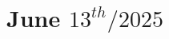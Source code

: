 \documentclass[../main.tex]{subfiles}
\begin{document}
\chapter{June $13^{th} / 2025$}
\label{ch:tufte-design}
\end{document}
